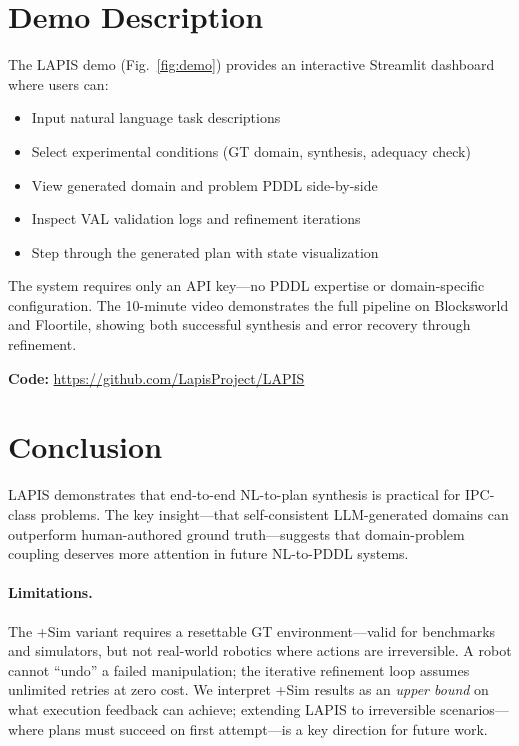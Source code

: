 \documentclass[letterpaper]{article}
\begin{document}
\section{Demo Description}

The LAPIS demo (Fig.~\ref{fig:demo}) provides an interactive Streamlit dashboard where users can:
\begin{itemize}[nosep,leftmargin=*]
  \item Input natural language task descriptions
  \item Select experimental conditions (GT domain, synthesis, adequacy check)
  \item View generated domain and problem PDDL side-by-side
  \item Inspect VAL validation logs and refinement iterations
  \item Step through the generated plan with state visualization
\end{itemize}

The system requires only an API key---no PDDL expertise or domain-specific configuration. The 10-minute video demonstrates the full pipeline on Blocksworld and Floortile, showing both successful synthesis and error recovery through refinement.


\textbf{Code:} \url{https://github.com/LapisProject/LAPIS}

\section{Conclusion}

LAPIS demonstrates that end-to-end NL-to-plan synthesis is practical for IPC-class problems. The key insight---that self-consistent LLM-generated domains can outperform human-authored ground truth---suggests that domain-problem coupling deserves more attention in future NL-to-PDDL systems.

\paragraph{Limitations.}
The +Sim variant requires a resettable GT environment---valid for benchmarks and simulators, but not real-world robotics where actions are irreversible. A robot cannot ``undo'' a failed manipulation; the iterative refinement loop assumes unlimited retries at zero cost. We interpret +Sim results as an \emph{upper bound} on what execution feedback can achieve; extending LAPIS to irreversible scenarios---where plans must succeed on first attempt---is a key direction for future work.


\end{document}
